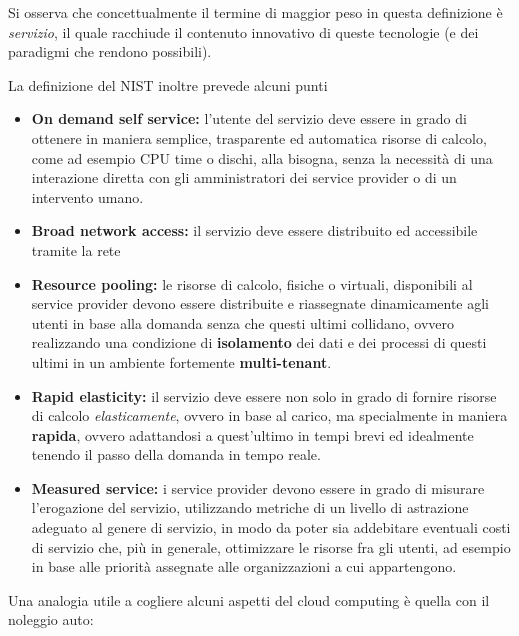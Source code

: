 Si osserva che concettualmente il termine di maggior peso in questa
definizione è \emph{servizio}, il quale racchiude il contenuto
innovativo di queste tecnologie (e dei paradigmi che rendono possibili).

La definizione del NIST inoltre prevede alcuni punti

\begin{itemize}
\tightlist
\item
  \textbf{On demand self service:} l'utente del servizio deve essere in
  grado di ottenere in maniera semplice, trasparente ed automatica
  risorse di calcolo, come ad esempio CPU time o dischi, alla bisogna,
  senza la necessità di una interazione diretta con gli amministratori
  dei service provider o di un intervento umano.
\item
  \textbf{Broad network access:} il servizio deve essere distribuito ed
  accessibile tramite la rete
\item
  \textbf{Resource pooling:} le risorse di calcolo, fisiche o virtuali,
  disponibili al service provider devono essere distribuite e
  riassegnate dinamicamente agli utenti in base alla domanda senza che
  questi ultimi collidano, ovvero realizzando una condizione di
  \textbf{isolamento} dei dati e dei processi di questi ultimi in un
  ambiente fortemente \textbf{multi-tenant}.
\item
  \textbf{Rapid elasticity:} il servizio deve essere non solo in grado
  di fornire risorse di calcolo \emph{elasticamente}, ovvero in base al
  carico, ma specialmente in maniera \textbf{rapida}, ovvero adattandosi
  a quest'ultimo in tempi brevi ed idealmente tenendo il passo della
  domanda in tempo reale.
\item
  \textbf{Measured service:} i service provider devono essere in grado
  di misurare l'erogazione del servizio, utilizzando metriche di un
  livello di astrazione adeguato al genere di servizio, in modo da poter
  sia addebitare eventuali costi di servizio che, più in generale,
  ottimizzare le risorse fra gli utenti, ad esempio in base alle
  priorità assegnate alle organizzazioni a cui appartengono.
\end{itemize}

Una analogia utile a cogliere alcuni aspetti del cloud computing è
quella con il noleggio auto:

